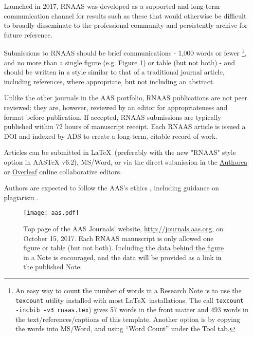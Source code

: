 \documentclass[RNAAS]{aastex63}
\newcommand\latex{La\TeX}
\begin{document}
Launched in 2017, RNAAS was developed as a supported and long-term
communication channel for results such as these that would otherwise be
difficult to broadly disseminate to the professional community and persistently
archive for future reference.

Submissions to RNAAS should be brief communications - 1,000 words or fewer
\footnote{An easy way to count the number of words in a Research Note is to use
the \texttt{texcount} utility installed with most \latex\ installations. The
call  \texttt{texcount -incbib -v3 rnaas.tex}) gives 57 words in the front
matter and 493 words in the text/references/captions of this template. Another
option is by copying the words into MS/Word, and using ``Word Count'' under the
Tool tab.}, and no more than a single figure (e.g. Figure \ref{fig:1}) or table
(but not both) - and should be written in a style similar to that of a
traditional journal article, including references, where appropriate, but not
including an abstract.

Unlike the other journals in the AAS portfolio, RNAAS publications are not
peer reviewed; they are, however, reviewed by an editor for appropriateness
and format before publication. If accepted, RNAAS submissions are typically
published within 72 hours of manuscript receipt. Each RNAAS article is
issued a DOI and indexed by ADS \citep{2000A&AS..143...41K} to create a
long-term, citable record of work.

Articles can be submitted in \latex\ (preferably with the new "RNAAS"
style option in AASTeX v6.2), MS/Word, or via the direct submission in the
\href{http://www.authorea.com}{Authorea} or
\href{http://www.overleaf.com}{Overleaf} online collaborative editors.

Authors are expected to follow the AAS's ethics \citep{2006ApJ...652..847K},
including guidance on plagiarism \citep{2012AAS...21920404V}.

\begin{figure}[h!]
\begin{center}
\texttt{[image: aas.pdf]}
\caption{Top page of the AAS Journals' website, \url{http://journals.aas.org},
on October 15, 2017.  Each RNAAS manuscript is only allowed one figure or
table (but not both). Including the
\href{http://journals.aas.org//authors/data.html\#DbF}{data behind the figure}
in a Note is encouraged, and the data will be provided as a link in the
published Note.\label{fig:1}}
\end{center}
\end{figure}
\end{document}
